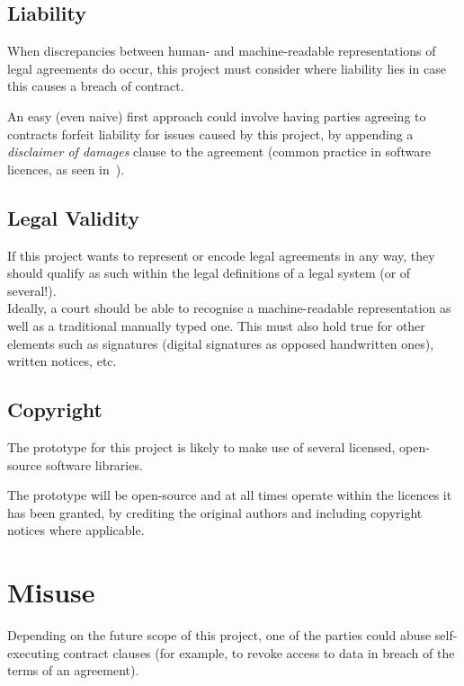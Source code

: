 
\subsection{Liability}\label{subsec:liability}

When discrepancies between human- and machine-readable representations of legal agreements do occur,
this project must consider where liability lies in case this causes a breach of contract.

An easy (even naive) first approach could involve having parties agreeing to contracts forfeit
liability for issues caused by this project, by appending a \textit{disclaimer of damages} clause to
the agreement (common practice in software licences, as seen
in~\cite[]{jetbrainsToolbox}).


\subsection{Legal Validity}\label{subsec:legal-validity}

If this project wants to represent or encode legal agreements in any way, they should qualify as
such within the legal definitions of a legal system (or of several!).\\

Ideally, a court should be able to recognise a machine-readable representation as well as a
traditional manually typed one.
This must also hold true for other elements such as signatures (digital signatures as opposed
handwritten ones), written notices, etc.

\subsection{Copyright}\label{subsec:copyright}

The prototype for this project is likely to make use of several licensed, open-source software
libraries.

The prototype will be open-source and at all times operate within the licences it has been granted,
by crediting the original authors and including copyright notices where applicable.

\section{Misuse}\label{sec:misuse}

Depending on the future scope of this project, one of the parties could abuse self-executing
contract clauses (for example, to revoke access to data in breach of the terms of an agreement).


